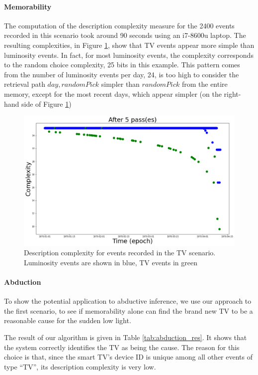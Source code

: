 \documentclass[entropy,article,submit,moreauthors,pdftex]{Definitions/mdpi}
\begin{document}
\paragraph{Memorability}
The computation of the description complexity measure for the 2400 events recorded in this scenario took around 90 seconds using an i7-8600u laptop. The resulting complexities, in Figure \ref{fig:scenar1_complexity}, show that TV events appear more simple than luminosity events. In fact, for most luminosity events, the complexity corresponds to the random choice complexity, 25 bits in this example. This pattern comes from the number of luminosity events per day, 24, is too high to consider the retrieval path $day,  randomPick$ simpler than $randomPick$ from the entire memory, except for the most recent days, which appear simpler (on the right-hand side of Figure \ref{fig:scenar1_complexity})
\begin{figure}
    \centering
    \includegraphics[width=.7\linewidth]{figures/memorability_scenar_1.png}
    \caption{Description complexity for events recorded in the TV scenario. Luminosity events are shown in blue, TV events in green}
    \label{fig:scenar1_complexity}
\end{figure}

\paragraph{Abduction}
To show the potential application to abductive inference, we use our approach to the first scenario, to see if memorability alone can find the brand new TV to be a reasonable cause for the sudden low light.

The result of our algorithm is given in Table \ref{tab:abduction_res}. It shows that the system correctly identifies the TV as being the cause. The reason for this choice is that, since the smart TV's device ID is unique among all other events of type ``TV'', its description complexity is very low.
\end{document}
